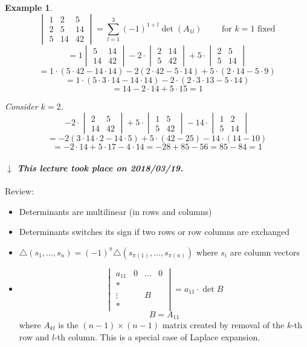 \documentclass{article}
\newtheorem{example}{Example}  \numberwithin{example}{section}
\newcommand{\dateref}[1]{%
  \begin{mdframed}[backgroundcolor=gray!10,innerbottommargin=0pt,innertopmargin=0pt]
    \paragraph{\textit{$\downarrow$ This lecture took place on #1.}}%
  \end{mdframed}%
}
\begin{document}
\begin{example} %
  \[
    \begin{vmatrix}
      1 & 2 & 5 \\
      2 & 5 & 14 \\
      5 & 14 & 42
    \end{vmatrix}
    = \sum_{l=1}^3 (-1)^{1+l} \det(A_{1l})
    \qquad \text{ for $k=1$ fixed}
  \]
  \[ = 1 \begin{vmatrix} 5 & 14 \\ 14 & 42 \end{vmatrix} - 2 \cdot \begin{vmatrix} 2 & 14 \\ 5 & 42 \end{vmatrix} + 5 \cdot \begin{vmatrix} 2 & 5 \\ 5 & 14 \end{vmatrix} \]
  \[ = 1 \cdot (5 \cdot 42 - 14 \cdot 14) - 2 (2 \cdot 42 - 5 \cdot 14) + 5 \cdot (2 \cdot 14 - 5 \cdot 9) \]
  \[ = 1 \cdot (5 \cdot 3 \cdot 14 - 14 \cdot 14) - 2 \cdot (2 \cdot 3 \cdot 13 - 5 \cdot 14) \]
  \[ = 14 - 2 \cdot 14 + 5 \cdot 15 = 1 \]

  Consider $k=2$.
  \[
    -2 \cdot \begin{vmatrix} 2 & 5 \\ 14 & 42 \end{vmatrix} + 5 \cdot \begin{vmatrix} 1 & 5 \\ 5 & 42 \end{vmatrix} - 14 \cdot \begin{vmatrix} 1 & 2 \\ 5 & 14 \end{vmatrix}
  \] \[
    = -2 (3 \cdot 14 \cdot 2 - 14 \cdot 5) + 5 \cdot (42 - 25) - 14 \cdot (14 - 10)
  \] \[
    = -2 \cdot 14 + 5 \cdot 17 - 4 \cdot 14 = -28 +85 -56 = 85 - 84 = 1
  \]
\end{example}

\dateref{2018/03/19}

Review:
\begin{itemize}
  \item Determinants are multilinear (in rows and columns)
  \item Determinants switches its sign if two rows or row columns are exchanged
  \item $\triangle(s_1, \dots, s_n) = (-1)^\pi \triangle(s_{\pi(1)}, \dots, s_{\pi(n)})$ where $s_i$ are column vectors
  \item
    \[
      \begin{vmatrix}
        a_{11} & 0 & \dots & 0 \\
        * &        &       & \\
        \vdots &   &  B    & \\
        * &        &       &
      \end{vmatrix}
      = a_{11} \cdot \det{B}
    \] \[
      B = A_{11}
    \]
    where $A_{kl}$ is the $(n-1) \times (n-1)$ matrix created by removal of the $k$-th row and $l$-th column.
    This is a special case of Laplace expansion.
\end{itemize}
\end{document}
